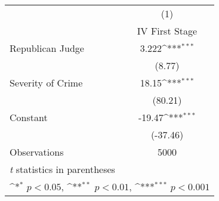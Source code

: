 {
\def\sym#1{\ifmmode^{#1}\else\(^{#1}\)\fi}
\begin{tabular}{l*{1}{c}}
\hline\hline
                    &\multicolumn{1}{c}{(1)}\\
                    &\multicolumn{1}{c}{IV First Stage}\\
\hline
Republican Judge    &       3.222\sym{***}\\
                    &      (8.77)         \\
[1em]
Severity of Crime   &       18.15\sym{***}\\
                    &     (80.21)         \\
[1em]
Constant            &      -19.47\sym{***}\\
                    &    (-37.46)         \\
\hline
Observations        &        5000         \\
\hline\hline
\multicolumn{2}{l}{\footnotesize \textit{t} statistics in parentheses}\\
\multicolumn{2}{l}{\footnotesize \sym{*} \(p<0.05\), \sym{**} \(p<0.01\), \sym{***} \(p<0.001\)}\\
\end{tabular}
}
